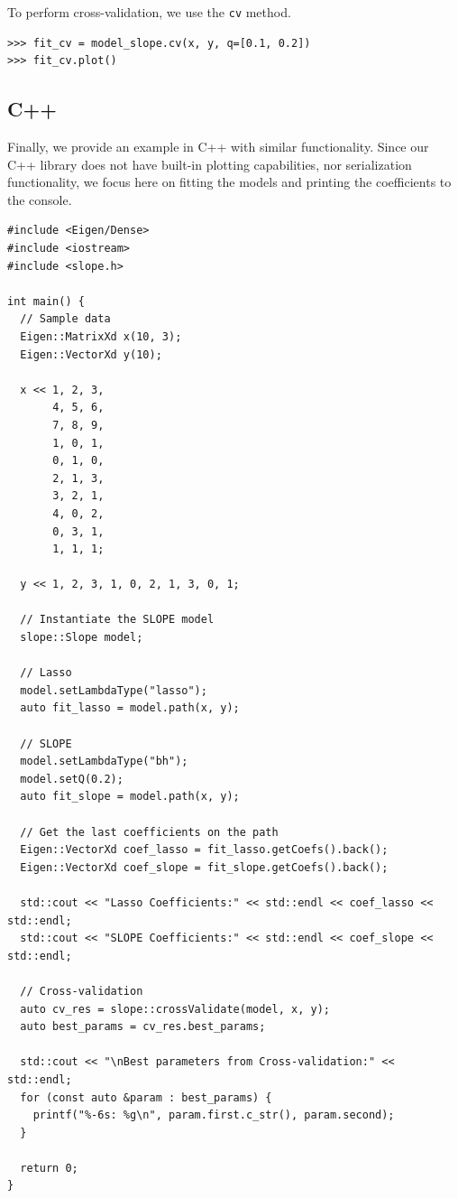 \documentclass[a4paper,fleqn]{cas-sc}
\begin{document}
To perform cross-validation, we use the \texttt{cv} method.

\begin{Verbatim}
>>> fit_cv = model_slope.cv(x, y, q=[0.1, 0.2])
>>> fit_cv.plot()
  \end{Verbatim}

\subsection{C++}

Finally, we provide an example in \textsf{C++} with similar functionality. Since
our \textsf{C++} library does not have built-in plotting capabilities, nor
serialization functionality, we focus here on fitting the models and printing
the coefficients to the console.

\begin{Verbatim}
#include <Eigen/Dense>
#include <iostream>
#include <slope.h>

int main() {
  // Sample data
  Eigen::MatrixXd x(10, 3);
  Eigen::VectorXd y(10);

  x << 1, 2, 3,
       4, 5, 6,
       7, 8, 9,
       1, 0, 1,
       0, 1, 0,
       2, 1, 3,
       3, 2, 1,
       4, 0, 2,
       0, 3, 1,
       1, 1, 1;

  y << 1, 2, 3, 1, 0, 2, 1, 3, 0, 1;

  // Instantiate the SLOPE model
  slope::Slope model;

  // Lasso
  model.setLambdaType("lasso");
  auto fit_lasso = model.path(x, y);

  // SLOPE
  model.setLambdaType("bh");
  model.setQ(0.2);
  auto fit_slope = model.path(x, y);

  // Get the last coefficients on the path
  Eigen::VectorXd coef_lasso = fit_lasso.getCoefs().back();
  Eigen::VectorXd coef_slope = fit_slope.getCoefs().back();

  std::cout << "Lasso Coefficients:" << std::endl << coef_lasso << std::endl;
  std::cout << "SLOPE Coefficients:" << std::endl << coef_slope << std::endl;

  // Cross-validation
  auto cv_res = slope::crossValidate(model, x, y);
  auto best_params = cv_res.best_params;

  std::cout << "\nBest parameters from Cross-validation:" << std::endl;
  for (const auto &param : best_params) {
    printf("%-6s: %g\n", param.first.c_str(), param.second);
  }

  return 0;
}
  \end{Verbatim}
\end{document}
